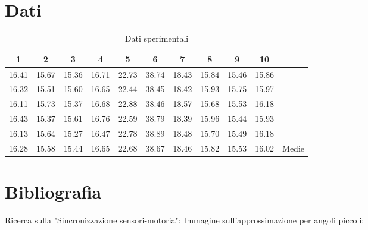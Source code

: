 \documentclass[a4paper]{article}
\begin{document}
    \section*{Dati}
    \begin{table}[h!]
        \centering
        \begin{tabular}{|c|c|c|c|c|c|c|c|c|c||c|}
             \hline
             1 & 2 & 3 & 4 & 5 & 6 & 7 & 8 & 9 & 10 & \\ [0.3ex]
             \hline\hline
             16.41 & 15.67 & 15.36 & 16.71 & 22.73 & 38.74 & 18.43 & 15.84 & 15.46 & 15.86 & \\
             16.32 & 15.51 & 15.60 & 16.65 & 22.44 & 38.45 & 18.42 & 15.93 & 15.75 & 15.97 & \\
             16.11 & 15.73 & 15.37 & 16.68 & 22.88 & 38.46 & 18.57 & 15.68 & 15.53 & 16.18 & \\
             16.43 & 15.37 & 15.61 & 16.76 & 22.59 & 38.79 & 18.39 & 15.96 & 15.44 & 15.93 & \\
             16.13 & 15.64 & 15.27 & 16.47 & 22.78 & 38.89 & 18.48 & 15.70 & 15.49 & 16.18 & \\
             \hline
             16.28 & 15.58 & 15.44 & 16.65 & 22.68 & 38.67 & 18.46 & 15.82 & 15.53 & 16.02 & Medie\\ 
             \hline
        \end{tabular}
        \caption{Dati sperimentali}
        \label{tab:dati}
    \end{table}
    
    \section*{Bibliografia}
        Ricerca sulla "Sincronizzazione sensori-motoria":
        Immagine sull'approssimazione per angoli piccoli:
    
\end{document}
